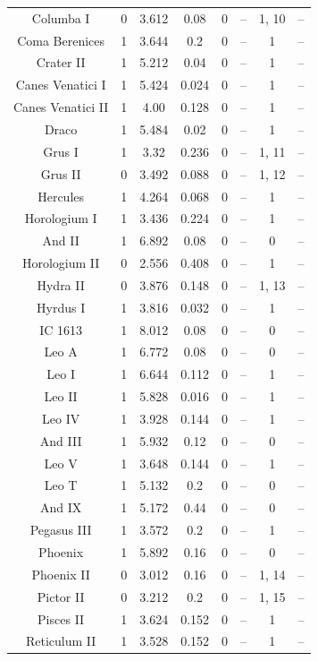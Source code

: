 \documentclass[twocolumn]{aastex631}
\begin{document}
\begin{longtable}{cccccccc}
Columba I & 0 & 3.612 & 0.08 & 0 & -- & 1, 10 & -- \\
Coma Berenices & 1 & 3.644 & 0.2 & 0 & -- & 1 & -- \\
Crater II & 1 & 5.212 & 0.04 & 0 & -- & 1 & -- \\
Canes Venatici I & 1 & 5.424 & 0.024 & 0 & -- & 1 & -- \\
Canes Venatici II & 1 & 4.00 & 0.128 & 0 & -- & 1 & -- \\ 
Draco & 1 & 5.484 & 0.02 & 0 & -- & 1 & -- \\
Grus I & 1 & 3.32 & 0.236 & 0 & -- & 1, 11 & -- \\
Grus II & 0 & 3.492 & 0.088 & 0 & -- & 1, 12 & -- \\
Hercules & 1 & 4.264 & 0.068 & 0 & -- & 1 & -- \\
Horologium I & 1 & 3.436 & 0.224 & 0 & -- & 1 & -- \\
And II & 1 & 6.892 & 0.08 & 0 & -- & 0 & -- \\
Horologium II & 0 & 2.556 & 0.408 & 0 & -- & 1 & -- \\
Hydra II & 0 & 3.876 & 0.148 & 0 & -- & 1, 13 & -- \\
Hyrdus I & 1 & 3.816 & 0.032 & 0 & -- & 1 & -- \\
IC 1613 & 1 & 8.012 & 0.08 & 0 & -- & 0 & -- \\
Leo A & 1 & 6.772 & 0.08 & 0 & -- & 0 & -- \\
Leo I & 1 & 6.644 & 0.112 & 0 & -- & 1 & -- \\
Leo II & 1 & 5.828 & 0.016 & 0 & -- & 1 & -- \\
Leo IV & 1 & 3.928 & 0.144 & 0 & -- & 1 & -- \\
And III & 1 & 5.932 & 0.12 & 0 & -- & 0 & -- \\
Leo V & 1 & 3.648 & 0.144 & 0 & -- & 1 & -- \\
Leo T & 1 & 5.132 & 0.2 & 0 & -- & 0 & -- \\ 
And IX & 1 & 5.172 & 0.44 & 0 & -- & 0 & -- \\
Pegasus III & 1 & 3.572 & 0.2 & 0 & -- & 1 & -- \\
Phoenix & 1 & 5.892 & 0.16 & 0 & -- & 0 & -- \\
Phoenix II & 0 & 3.012 & 0.16 & 0 & -- & 1, 14 & -- \\
Pictor II & 0 & 3.212 & 0.2 & 0 & -- & 1, 15 & -- \\
Pisces II & 1 & 3.624 & 0.152 & 0 & -- & 1 & -- \\
Reticulum II & 1 & 3.528 & 0.152 & 0 & -- & 1 & -- \\

\end{longtable}
\end{document}
